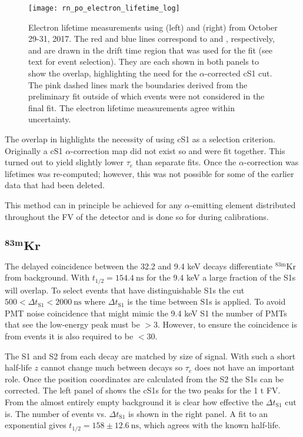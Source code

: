 \begin{figure}
\centering
\texttt{[image: rn\_po\_electron\_lifetime\_log]}
\caption{Electron lifetime measurements using  (left) and  (right) from October 29-31, 2017.  The red and blue
lines correspond to  and , respectively, and are drawn in the drift time region that was used for the fit (see
text for event selection).  They are each shown in both panels to show the \stwob overlap, highlighting the need for the
$\alpha$-corrected cS1 cut.  The pink dashed lines mark the boundaries derived from the preliminary fit outside of which events were not
considered in the final fit.  The electron lifetime measurements agree within uncertainty.}
\label{fig:electron_lifetimes_measurement_alphas_elifetime}
\end{figure}

The overlap in \stwob highlights the necessity of using cS1 as a selection criterion.  Originally a cS1 $\alpha$-correction map did not
exist so  and  were fit together.  This turned out to yield slightly lower $\tau_e$ than separate fits.  Once
the $\alpha$-correction was lifetimes was re-computed; however, this was not possible for some of the earlier data that had been
deleted.

This method can in principle be achieved for any $\alpha$-emitting element distributed throughout the FV of the detector and is done so
for  during  calibrations.



\subsection{$\mathbf{^{83m}Kr}$}
\label{subsec:electron_lifetimes_measurement_kr}
The delayed coincidence between the 32.2 and 9.4 keV decays differentiate $\mathrm{^{83m}Kr}$ from background.  With
$t_{1/2} = 154.4\ \mathrm{ns}$ for the 9.4 keV a large fraction of the S1s will overlap.  To select events that have distinguishable S1s
the cut $500 < \Delta t_{\mathrm{S1}} < 2000\ \mathrm{ns}$
where $\Delta t_{\mathrm{S1}}$ is the time between S1s is applied.  To avoid PMT noise coincidence that might mimic the 9.4 keV S1
the number of PMTs that see the low-energy peak must be $> 3$.  However, to ensure the coincidence is from \metakr events it is also
required to be $< 30$.

The S1 and S2 from each decay are matched by size of signal.  With such a short half-life $z$ cannot change much between decays so
$\tau_e$ does not have an important role.  Once the position coordinates are calculated from the S2 the S1s can be
corrected.  The left panel of  shows the cS1s for the two peaks for the
1 t FV.  From the
almost entirely empty background it is clear how effective the $\Delta t_{\mathrm{S1}}$ cut is.  The number of events vs.
$\Delta t_{\mathrm{S1}}$ is shown in the right panel.  A fit to an exponential gives $t_{1/2} = 158 \pm 12.6\ \mathrm{ns}$, which
agrees with the known half-life.

